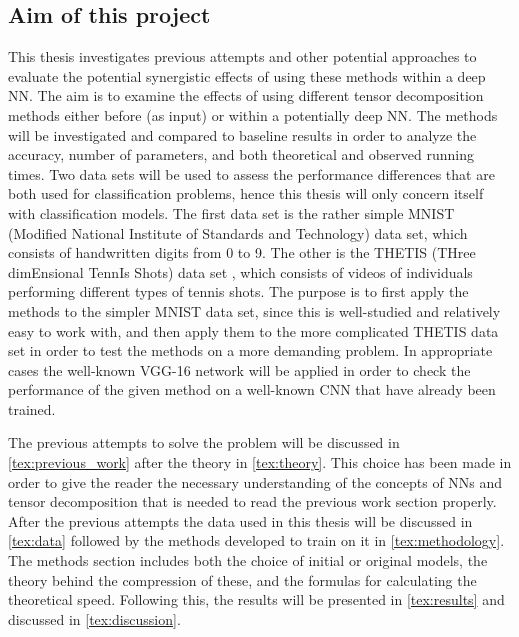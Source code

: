 \subsection{Aim of this project}
This thesis investigates previous attempts and other potential approaches to evaluate the potential synergistic effects of using these methods within a deep NN. The aim is to examine the effects of using different tensor decomposition methods either before (as input) or within a potentially deep NN. The methods will be investigated and compared to baseline results in order to analyze the accuracy, number of parameters, and both theoretical and observed running times. Two data sets will be used to assess the performance differences that are both used for classification problems, hence this thesis will only concern itself with classification models. The first data set is the rather simple MNIST (Modified National Institute of Standards and Technology) data set\cite{MNIST}, which consists of handwritten digits from 0 to 9. The other is the THETIS (THree dimEnsional TennIs Shots) data set \cite{Gourgari2013}, which consists of videos of individuals performing different types of tennis shots. The purpose is to first apply the methods to the simpler MNIST data set, since this is well-studied and relatively easy to work with, and then apply them to the more complicated THETIS data set in order to test the methods on a more demanding problem. In appropriate cases the well-known VGG-16 network will be applied in order to check the performance of the given method on a well-known CNN that have already been trained.

The previous attempts to solve the problem will be discussed in \autoref{tex:previous_work} after the theory in \autoref{tex:theory}. This choice has been made in order to give the reader the necessary understanding of the concepts of NNs and tensor decomposition that is needed to read the previous work section properly. After the previous attempts the data used in this thesis will be discussed in \autoref{tex:data} followed by the methods developed to train on it in \autoref{tex:methodology}. The methods section includes both the choice of initial or original models, the theory behind the compression of these, and the formulas for calculating the theoretical speed. Following this, the results will be presented in \autoref{tex:results} and discussed in \autoref{tex:discussion}.